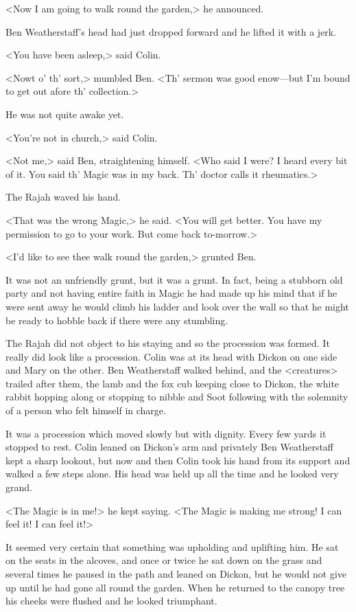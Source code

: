 <Now I am going to walk round the garden,> he announced.

Ben Weatherstaff's head had just dropped forward and he lifted it with a jerk.

<You have been asleep,> said Colin.

<Nowt o' th' sort,> mumbled Ben. <Th' sermon was good enow—but I'm bound to get out afore th' collection.>

He was not quite awake yet.

<You're not in church,> said Colin.

<Not me,> said Ben, straightening himself. <Who said I were? I heard every bit of it. You said th' Magic was in my back. Th' doctor calls it rheumatics.>

The Rajah waved his hand.

<That was the wrong Magic,> he said. <You will get better. You have my permission to go to your work. But come back to-morrow.>

<I'd like to see thee walk round the garden,> grunted Ben.

It was not an unfriendly grunt, but it was a grunt. In fact, being a stubborn old party and not having entire faith in Magic he had made up his mind that if he were sent away he would climb his ladder and look over the wall so that he might be ready to hobble back if there were any stumbling.

The Rajah did not object to his staying and so the procession was formed. It really did look like a procession. Colin was at its head with Dickon on one side and Mary on the other. Ben Weatherstaff walked behind, and the <creatures> trailed after them, the lamb and the fox cub keeping close to Dickon, the white rabbit hopping along or stopping to nibble and Soot following with the solemnity of a person who felt himself in charge.

It was a procession which moved slowly but with dignity. Every few yards it stopped to rest. Colin leaned on Dickon's arm and privately Ben Weatherstaff kept a sharp lookout, but now and then Colin took his hand from its support and walked a few steps alone. His head was held up all the time and he looked very grand.

<The Magic is in me!> he kept saying. <The Magic is making me strong! I can feel it! I can feel it!>

It seemed very certain that something was upholding and uplifting him. He sat on the seats in the alcoves, and once or twice he sat down on the grass and several times he paused in the path and leaned on Dickon, but he would not give up until he had gone all round the garden. When he returned to the canopy tree his cheeks were flushed and he looked triumphant.

